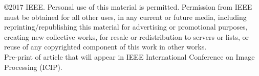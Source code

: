 \onecolumn

\noindent \copyright 2017 IEEE. Personal use of this material is permitted. Permission from IEEE must be obtained for all other uses, in any current or future media, including reprinting/republishing this material for advertising or promotional purposes, creating new collective works, for resale or redistribution to servers or lists, or reuse of any copyrighted component of this work in other works.
\\

\noindent Pre-print of article that will appear in IEEE International Conference on Image Processing (ICIP).
\\


\twocolumn
\newpage